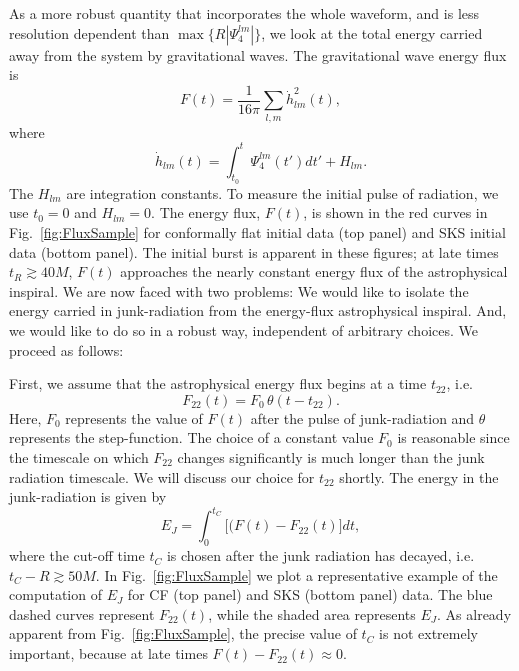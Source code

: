As a more robust quantity that incorporates the whole waveform, and is
less resolution dependent than $\max\{R|\Psi_4^{lm}|\}$, we look at the
total energy carried away from the system by gravitational waves. The
 gravitational wave energy flux is~
\begin{equation}
F(t) =\frac{1}{16\pi}\sum_{l,m}\dot{h}_{lm}^2(t),
\end{equation}
where
\begin{equation}
\dot{h}_{lm}(t)=\int_{t_0}^{t}{\Psi_4^{lm}(t')dt'} + H_{lm}.
\end{equation}
The $H_{lm}$ are integration constants.  To measure the
  initial pulse of radiation, we use $t_0=0$ and $H_{lm}=0$.  The energy flux, $F(t)$, is shown in
the red curves in Fig.~\ref{fig:FluxSample} for conformally flat initial data (top
panel) and SKS initial data (bottom panel).  The initial burst
  is apparent in these figures; at late times $t_R\gtrsim 40M$, $F(t)$
  approaches the nearly constant energy flux of the astrophysical
  inspiral.  We are now faced with two problems: We would like to
  isolate the energy carried in junk-radiation from the energy-flux
  astrophysical inspiral.  And, we would like to do so in a robust way, 
independent of arbitrary choices.  We
  proceed as follows:

  First, we assume that the astrophysical energy flux begins at a time
  $t_{22}$, i.e.
\begin{equation}
  F_{22}(t) = F_0\,\theta(t-t_{22}).
\end{equation}
Here, $F_0$ represents the value of $F(t)$ after the pulse of
junk-radiation and $\theta$ represents the step-function.
The choice of a constant value $F_0$ is reasonable since the
timescale on which $F_{22}$ changes significantly is much longer than
the junk radiation timescale.
We will
discuss our choice for $t_{22}$ shortly.  The energy in the
junk-radiation is given by
\begin{equation}\label{eq:EJ}
E_J=\int_0^{t_C}\big[(F(t)-F_{22}(t)\big]dt,
\end{equation}
where the cut-off time $t_C$ is chosen after the junk radiation has
decayed, i.e. $t_C-R\gtrsim 50M$.  In Fig.~\ref{fig:FluxSample} we
plot a representative example of the computation of $E_J$ for CF (top
panel) and SKS (bottom panel) data. The blue dashed curves represent
$F_{22}(t)$, while the shaded area represents $E_J$.
As
already apparent from Fig.~\ref{fig:FluxSample}, the precise value of
$t_C$ is not extremely important, because at late times $F(t)-F_{22}(t)\approx 0$.  


